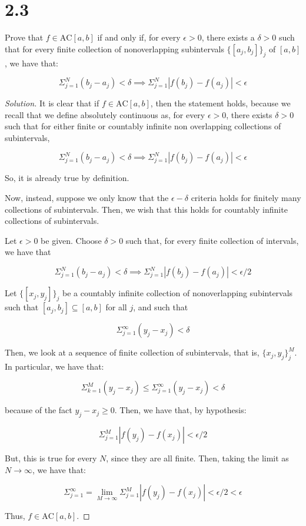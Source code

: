\documentclass[10pt]{article}
\newcommand{\ac}{{\text{AC}}}
\newenvironment{problem}[2][Problem]{\begin{trivlist}
\item[\hskip \labelsep {\bfseries #1}\hskip \labelsep {\bfseries #2.}]}{\end{trivlist}}
\begin{document}
\section*{2.3}

\begin{problem}{6.1.9}

Prove that $f \in \text{AC}[a,b]$ if and only if, for every $\epsilon > 0$, there exists a $\delta > 0$ such that for every finite collection of nonoverlapping subintervals $\{ [a_j,b_j] \}_j$ of $[a,b]$, we have that:

$$ \Sigma_{j=1}^N (b_j - a_j) < \delta \implies \Sigma_{j=1}^N |f(b_j) - f(a_j)| < \epsilon $$


\end{problem}
\begin{proof}[Solution]

It is clear that if $f \in \ac[a,b]$, then the statement holds, because we recall that we define absolutely continuous as, for every $\epsilon > 0$, there exists $\delta > 0$ such that for either finite or countably infinite non overlapping collections of subintervals,

$$ \Sigma_{j=1}^N (b_j - a_j) < \delta \implies \Sigma_{j=1}^N |f(b_j) - f(a_j)| < \epsilon $$

So, it is already true by definition.

Now, instead, suppose we only know that the $\epsilon-\delta$ criteria holds for finitely many collections of subintervals. Then, we wish that this holds for countably infinite collections of subintervals.

Let $\epsilon > 0$ be given. Choose $\delta > 0$ such that, for every finite collection of intervals, we have that

$$ \Sigma_{j=1}^N (b_j - a_j) < \delta \implies \Sigma_{j=1}^N |f(b_j) - f(a_j)| < \epsilon/2 $$

Let $\{ [x_j,y_j] \}_j$ be a countably infinite collection of nonoverlapping subintervals such that $[a_j,b_j] \subseteq [a,b]$ for all $j$, and such that

$$ \Sigma_{j=1}^\infty (y_j - x_j) < \delta $$

Then, we look at a sequence of finite collection of subintervals, that is, $\{ x_j,y_j \}_j^M$. In particular, we have that:

$$ \Sigma_{k=1}^M (y_j - x_j) \leq \Sigma_{j=1}^\infty (y_j - x_j) < \delta $$

because of the fact $y_j - x_j \geq 0$. Then, we have that, by hypothesis:

$$  \Sigma_{j=1}^M |f(y_j) - f(x_j)| < \epsilon/2 $$

But, this is true for every $N$, since they are all finite. Then, taking the limit as $N \to \infty$, we have that:

$$ \Sigma_{j=1}^\infty = \lim_{M \to \infty} \Sigma_{j=1}^M  |f(y_j) - f(x_j)| < \epsilon/2 < \epsilon $$

Thus, $f \in \ac[a,b]$. 

\end{proof}
\end{document}
